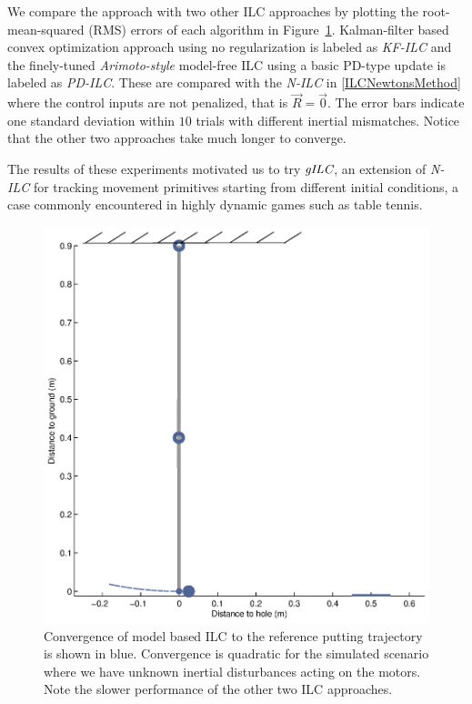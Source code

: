 We compare the approach with two other ILC approaches by plotting the root-mean-squared (RMS) errors of each algorithm in Figure~\ref{ILCTrajectoryPutting}. Kalman-filter based convex optimization approach \cite{Schoellig12} using no regularization is labeled as \emph{KF-ILC} and the finely-tuned \emph{Arimoto-style} \cite{Arimoto84} model-free ILC using a basic PD-type update is labeled as \emph{PD-ILC}. These are compared with the \emph{N-ILC} in \eqref{ILCNewtonsMethod} where the control inputs are not penalized, that is $\vec{R} = \vec{0}$. The error bars indicate one standard deviation within $10$ trials with different inertial mismatches. Notice that the other two approaches take much longer to converge. 

The results of these experiments motivated us to try $\emph{gILC}$, an extension of \emph{N-ILC} for tracking movement primitives starting from different initial conditions, a case commonly encountered in highly dynamic games such as table tennis.

\begin{figure}
\centering
\includegraphics[scale=0.25]{putting1.eps}
\caption{Convergence of model based ILC to the reference putting trajectory is shown in blue. Convergence is quadratic for the simulated scenario where we have unknown inertial disturbances acting on the motors. Note the slower performance of the other two ILC approaches.}
\label{ILCTrajectoryPutting}
\end{figure}


